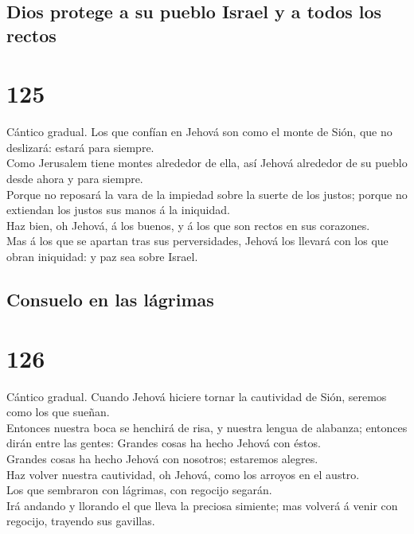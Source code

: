 \hypertarget{dios-protege-a-su-pueblo-israel-y-a-todos-los-rectos}{%
\subsection{Dios protege a su pueblo Israel y a todos los
rectos}\label{dios-protege-a-su-pueblo-israel-y-a-todos-los-rectos}}

\hypertarget{section-19-125}{%
\section{125}\label{section-19-125}}

 Cántico gradual. Los que confían en Jehová son como el
monte de Sión, que no deslizará: estará para siempre.\\
 Como Jerusalem tiene montes alrededor de ella, así Jehová
alrededor de su pueblo desde ahora y para siempre.\\
 Porque no reposará la vara de la impiedad sobre la suerte
de los justos; porque no extiendan los justos sus manos á la
iniquidad.\\
 Haz bien, oh Jehová, á los buenos, y á los que son rectos
en sus corazones.\\
 Mas á los que se apartan tras sus perversidades, Jehová
los llevará con los que obran iniquidad: y paz sea sobre Israel.

\hypertarget{consuelo-en-las-luxe1grimas}{%
\subsection{Consuelo en las
lágrimas}\label{consuelo-en-las-luxe1grimas}}

\hypertarget{section-19-126}{%
\section{126}\label{section-19-126}}

 Cántico gradual. Cuando Jehová hiciere tornar la
cautividad de Sión, seremos como los que sueñan.\\
 Entonces nuestra boca se henchirá de risa, y nuestra
lengua de alabanza; entonces dirán entre las gentes: Grandes cosas ha
hecho Jehová con éstos.\\
 Grandes cosas ha hecho Jehová con nosotros; estaremos
alegres.\\
 Haz volver nuestra cautividad, oh Jehová, como los
arroyos en el austro.\\
 Los que sembraron con lágrimas, con regocijo segarán.\\
 Irá andando y llorando el que lleva la preciosa simiente;
mas volverá á venir con regocijo, trayendo sus gavillas.

